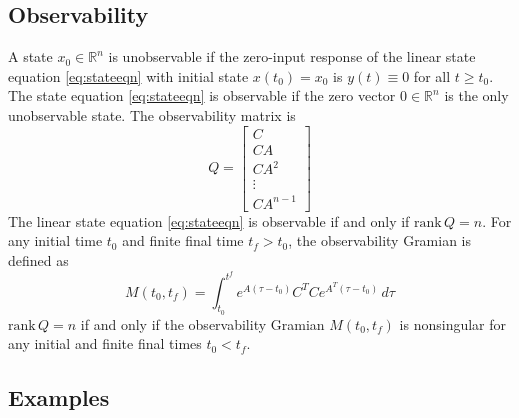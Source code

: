 \documentclass[11pt]{book}
\theoremstyle{example}
\begin{document}
\subsection{Observability}

A state $x_0\in\mathbb{R}^n$ is unobservable if the zero-input response of the linear state equation \ref{eq:stateeqn} with initial state $x(t_0)=x_0$ is $y(t)\equiv{0}$ for all $t\geq{t_0}$. The state equation \ref{eq:stateeqn} is observable if the zero vector $0\in\mathbb{R}^n$ is the only unobservable state.
The observability matrix is
\begin{equation}
	Q=
	\begin{bmatrix}
		C\\
		CA\\
		CA^2\\
		\vdots\\
		CA^{n-1}
	\end{bmatrix}
\end{equation}
The linear state equation \ref{eq:stateeqn} is observable if and only if $\mathrm{rank}\,Q=n$.
For any initial time $t_0$ and finite final time $t_f>t_0$, the observability Gramian is defined as
\begin{equation}
	M(t_0,t_f)=\int_{t_0}^{t^f}{e^{A(\tau-t_0)}C^TCe^{A^T(\tau-t_0)}\,d\tau}
\end{equation}
$\mathrm{rank}\,Q=n$ if and only if the observability Gramian $M(t_0,t_f)$ is nonsingular for any initial and finite final times $t_0<t_f$.

\subsection{Examples}
\end{document}
